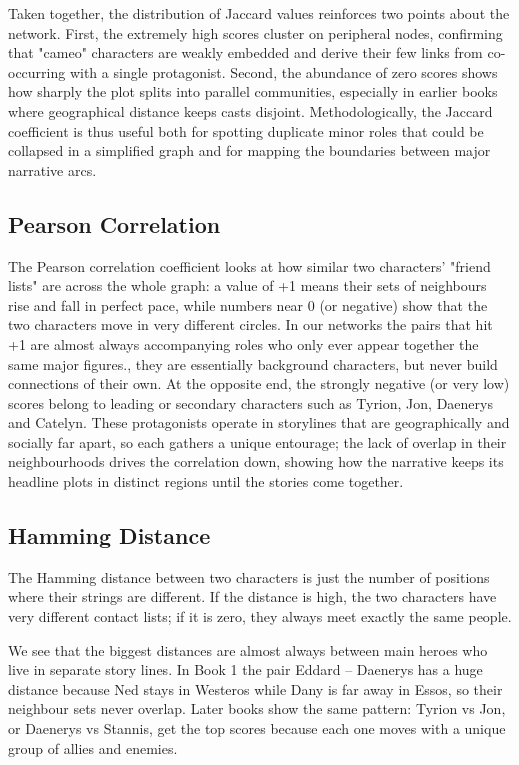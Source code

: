 \documentclass[12pt, a4paper]{article}
\begin{document}
Taken together, the distribution of Jaccard values reinforces two points about the network.
First, the extremely high scores cluster on peripheral nodes, confirming that "cameo" characters are weakly embedded and derive their few links from co-occurring with a single protagonist.
Second, the abundance of zero scores shows how sharply the plot splits into parallel communities, especially in earlier books where geographical distance keeps casts disjoint.
Methodologically, the Jaccard coefficient is thus useful both for spotting duplicate minor roles that could be collapsed in a simplified graph and for mapping the boundaries between major narrative arcs.
\subsection*{Pearson Correlation} 
The Pearson correlation coefficient looks at how similar two characters' "friend lists"
 are across the whole graph: a value of +1 means their sets of neighbours 
 rise and fall in perfect pace, while numbers near 0 (or negative) show 
 that the two characters move in very different circles. In our networks the pairs
  that hit +1 are almost always accompanying roles who only ever appear together
   the same major figures., they are essentially background characters,  
   but never build connections of their own. At the opposite end, the strongly negative
    (or very low) scores belong to leading or secondary characters such as Tyrion, Jon,
	 Daenerys and Catelyn. These protagonists operate in storylines that are geographically
	 and socially far apart, so each gathers a unique entourage; the lack of overlap in their 
	 neighbourhoods drives the correlation down, showing how the narrative 
	 keeps its headline plots in distinct regions until the stories come together.
\subsection*{Hamming Distance}

The Hamming distance between two characters is just the number of positions where their strings are different.
If the distance is high, the two characters have very different contact lists; if it is zero, they always meet exactly the same people.

We see that the biggest distances are almost always between main heroes who live in separate story lines.
In Book 1 the pair Eddard – Daenerys has a huge distance because Ned stays in Westeros while Dany is far away in Essos, so their neighbour sets never overlap.
Later books show the same pattern: Tyrion vs Jon, or Daenerys vs Stannis, get the top scores because each one moves with a unique group of allies and enemies.
\end{document}
